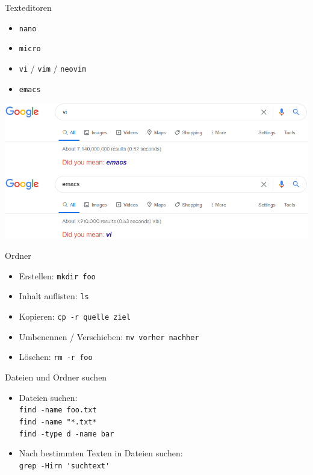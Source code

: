 \documentclass[compress]{beamer}
\begin{document}
\begin{frame}[fragile]{Texteditoren}
    \begin{itemize}
        \item \verb+nano+
        \item \verb+micro+
        \item \verb+vi+ / \verb+vim+ / \verb+neovim+
        \item \verb+emacs+
    \end{itemize}
    \vspace{3mm}
    \includegraphics[width=.9\textwidth]{emacsvi.png}
\end{frame}

\begin{frame}[fragile]{Ordner}
\begin{itemize}
\item Erstellen: \verb+mkdir foo+
\item Inhalt auflisten: \verb+ls+
\item Kopieren: \verb+cp -r quelle ziel+
\item Umbenennen / Verschieben: \verb+mv vorher nachher+
\item Löschen: \verb+rm -r foo+
\end{itemize}
\end{frame}

\begin{frame}[fragile]{Dateien und Ordner suchen}
\begin{itemize}
\item Dateien suchen: \\
\verb+find -name foo.txt+ \\
\verb+find -name "*.txt*+ \\
\verb+find -type d -name bar+
\item Nach bestimmten Texten in Dateien suchen:\\
\verb+grep -Hirn 'suchtext'+
\end{itemize}
\end{frame}
\end{document}
